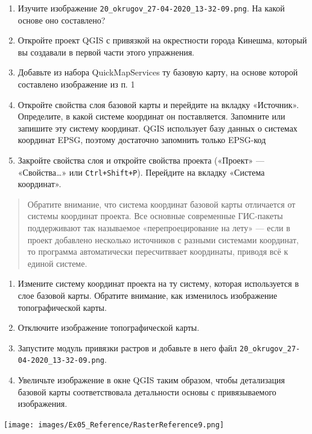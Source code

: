 \documentclass[
  12pt,
]{book}
\begin{document}
\begin{enumerate}
\def\labelenumi{\arabic{enumi}.}
\item
  Изучите изображение \texttt{20\_okrugov\_27-04-2020\_13-32-09.png}. На какой основе оно составлено?
\item
  Откройте проект QGIS с привязкой на окрестности города Кинешма, который вы создавали в первой части этого упражнения.
\item
  Добавьте из набора QuickMapServices ту базовую карту, на основе которой составлено изображение из п. 1
\item
  Откройте свойства слоя базовой карты и перейдите на вкладку «Источник». Определите, в какой системе координат он поставляется. Запомните или запишите эту систему координат. QGIS использует базу данных о системах координат EPSG, поэтому достаточно запомнить только EPSG-код
\item
  Закройте свойства слоя и откройте свойства проекта («Проект» --- «Свойства\ldots» или \texttt{Ctrl+Shift+P}). Перейдите на вкладку «Система координат».
\end{enumerate}

\begin{quote}
Обратите внимание, что система координат базовой карты отличается от системы координат проекта. Все основные современные ГИС-пакеты поддерживают так называемое «перепроецирование на лету» --- если в проект добавлено несколько источников с разными системами координат, то программа автоматически пересчитввает координаты, приводя всё к единой системе.
\end{quote}

\begin{enumerate}
\def\labelenumi{\arabic{enumi}.}
\setcounter{enumi}{4}
\item
  Измените систему координат проекта на ту систему, которая используется в слое базовой карты. Обратите внимание, как изменилось изображение топографической карты.
\item
  Отключите изображение топографической карты.
\item
  Запустите модуль привязки растров и добавьте в него файл \texttt{20\_okrugov\_27-04-2020\_13-32-09.png}.
\item
  Увеличьте изображение в окне QGIS таким образом, чтобы детализация базовой карты соответствовала детальности основы с привязываемого изображения.
\end{enumerate}

\texttt{[image: images/Ex05\_Reference/RasterReference9.png]}
\end{document}

